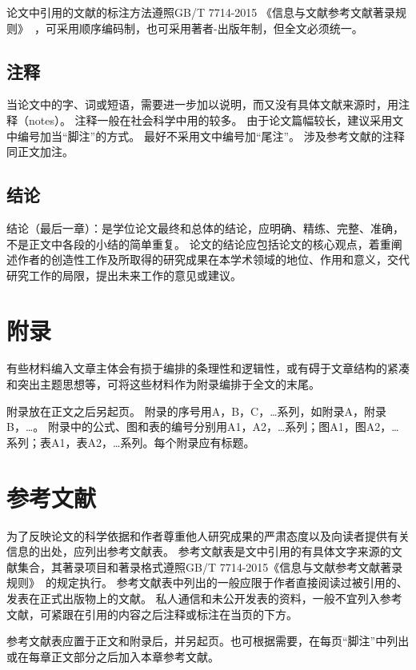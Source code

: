 论文中引用的文献的标注方法遵照GB/T 7714-2015 《信息与文献参考文献著录规则》~\cite{SCSF00045714}，可采用顺序编码制，也可采用著者-出版年制，但全文必须统一。

\subsection{注释}

当论文中的字、词或短语，需要进一步加以说明，而又没有具体文献来源时，用注释（notes）。
注释一般在社会科学中用的较多。
由于论文篇幅较长，建议采用文中编号加当“脚注”的方式。
最好不采用文中编号加“尾注”。
涉及参考文献的注释同正文加注。

\subsection{结论}

结论（最后一章）：是学位论文最终和总体的结论，应明确、精练、完整、准确，不是正文中各段的小结的简单重复。
论文的结论应包括论文的核心观点，着重阐述作者的创造性工作及所取得的研究成果在本学术领域的地位、作用和意义，交代研究工作的局限，提出未来工作的意见或建议。

\section{附录}

有些材料编入文章主体会有损于编排的条理性和逻辑性，或有碍于文章结构的紧凑和突出主题思想等，可将这些材料作为附录编排于全文的末尾。

附录放在正文之后另起页。
附录的序号用A，B，C，…系列，如附录A，附录B，…。
附录中的公式、图和表的编号分别用A1，A2，…系列；图A1，图A2，…系列；表A1，表A2，…系列。每个附录应有标题。

\section{参考文献}

为了反映论文的科学依据和作者尊重他人研究成果的严肃态度以及向读者提供有关信息的出处，应列出参考文献表。
参考文献表是文中引用的有具体文字来源的文献集合，其著录项目和著录格式遵照GB/T 7714-2015《信息与文献参考文献著录规则》~\cite{SCSF00045714}的规定执行。
参考文献表中列出的一般应限于作者直接阅读过被引用的、发表在正式出版物上的文献。
私人通信和未公开发表的资料，一般不宜列入参考文献，可紧跟在引用的内容之后注释或标注在当页的下方。

参考文献表应置于正文和附录后，并另起页。也可根据需要，在每页“脚注”中列出或在每章正文部分之后加入本章参考文献。

